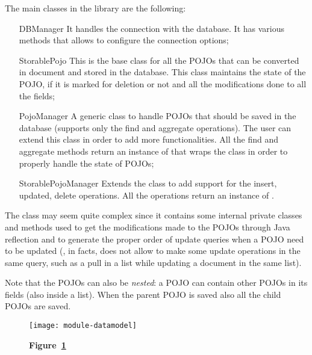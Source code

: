 The main classes in the library are the following:
\begin{itemize}
	\item[DBManager] It handles the connection with the database. It has
		various methods that allows to configure the connection options;
	\item[StorablePojo] This is the base class for all the POJOs that can be
		converted in document and stored in the database. This class
		maintains the state of the POJO, if it is marked for deletion or
		not and all the modifications done to all the fields;
	\item[PojoManager] A generic class to handle POJOs that should
		 be saved in the database (supports only the find
		and aggregate operations). The user can extend this class in
		order to add more functionalities. All the find and aggregate
		methods return an instance of  that wraps the
		 class in order to properly handle the state
		of POJOs;
	\item[StorablePojoManager] Extends the  class to add
		support for the insert, updated, delete operations. All the
		operations return an instance of .
\end{itemize}
The  class may seem quite complex since it contains
some internal private classes and methods used to get the modifications made to
the POJOs through Java reflection and to generate the proper order of update
queries when a POJO need to be updated (\mongodb{}, in facts, does not allow to
make some update operations in the same query, such as a pull in a list while
updating a document in the same list).

Note that the POJOs can also be \emph{nested}: a POJO can contain other POJOs in
its fields (also inside a list). When the parent POJO is saved also all the
child POJOs are saved.

\begin{landscape}
	\begin{figure}[!h]
		\texttt{[image: module-datamodel]}
		\caption*{\textbf{Figure~\ref{fig:datamodel}}}
		\captionlistentry{}\label{fig:datamodel}
	\end{figure}
\end{landscape}

